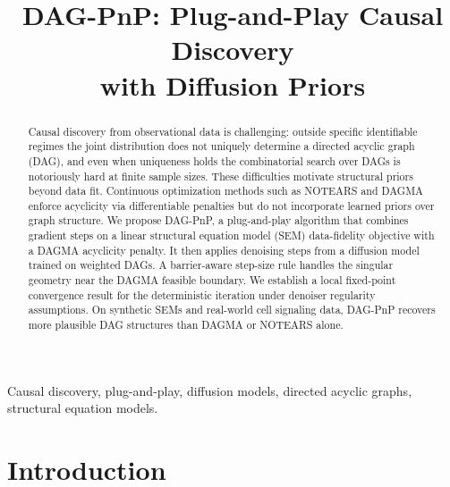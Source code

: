 \documentclass[conference]{IEEEtran}
\newcommand{\sms}[1]{{\color{cyan}{[SS: #1]}}}
\begin{document}
	
	\title{DAG-PnP: Plug-and-Play Causal Discovery\\ with Diffusion Priors}
	\author{%
	}
	
	\maketitle
	
	\begin{abstract}
		Causal discovery from observational data is challenging: outside specific identifiable regimes the joint distribution does not uniquely determine a directed acyclic graph (DAG), and even when uniqueness holds the combinatorial search over DAGs is notoriously hard at finite sample sizes. These difficulties motivate structural priors beyond data fit. Continuous optimization methods such as NOTEARS and DAGMA enforce acyclicity via differentiable penalties but do not incorporate learned priors over graph structure. 
        We propose DAG-PnP, a plug-and-play algorithm that combines gradient steps on a linear structural equation model (SEM) data-fidelity objective with a DAGMA acyclicity penalty. It then applies denoising steps from a diffusion model trained on weighted DAGs. A barrier-aware step-size rule handles the singular geometry near the DAGMA feasible boundary. We establish a local fixed-point convergence result for the deterministic iteration under denoiser regularity assumptions. On synthetic SEMs and real-world cell signaling data, DAG-PnP recovers more plausible DAG structures than DAGMA or NOTEARS alone. 
	\end{abstract}
	
	\begin{IEEEkeywords}
		Causal discovery, plug-and-play, diffusion models, directed acyclic graphs, structural equation models.
	\end{IEEEkeywords}
	
	\section{Introduction}
	
\end{document}
